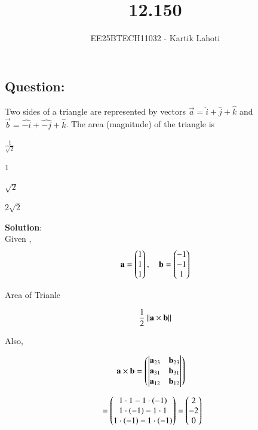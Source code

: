 \documentclass[journal]{IEEEtran}
\numberwithin{equation}{enumi}
\numberwithin{figure}{enumi}
\begin{document}

\vspace{3cm}

\title{12.150}
\author{EE25BTECH11032 - Kartik Lahoti}
\maketitle

\subsection*{Question: } 
Two sides of a triangle are represented by vectors $\vec{a} = \hat{i}+\hat{j}+\hat{k}$ and 
$\vec{b} = \hat{-i}+\hat{-j}+\hat{k}$. The area (magnitude) of the triangle is

\begin{enumerate}
    \begin{multicols}{4}
    \item $\frac{1}{\sqrt{2}}$
    \item $1$
    \item $\sqrt{2}$
    \item $2\sqrt{2}$
    \end{multicols}
\end{enumerate}

\textbf{Solution}:\\

Given , 
\begin{align}
    \mathbf{a} = \begin{pmatrix}1\\1\\1\end{pmatrix} , \quad \mathbf{b} = \begin{pmatrix}-1\\-1\\1\end{pmatrix}
\end{align}

Area of Trianle 

\begin{align}
    \frac{1}{2}\left\lVert\mathbf{a}\times\mathbf{b}\right\rVert
\end{align}

Also, 

\begin{align}
    \mathbf{a}\times\mathbf{b} &= \begin{pmatrix}\begin{vmatrix}\mathbf{a}_{23} \quad \mathbf{b}_{23}\end{vmatrix} \\ \begin{vmatrix}\mathbf{a}_{31} \quad \mathbf{b}_{31}\end{vmatrix} \\ \begin{vmatrix}\mathbf{a}_{12} \quad \mathbf{b}_{12}\end{vmatrix}\end{pmatrix}
\end{align}

\begin{align}
    &= \begin{pmatrix}1\cdot1 - 1\cdot\left(-1\right) \\ 1\cdot\left(-1\right) - 1\cdot1 \\ 1\cdot\left(-1\right) - 1\cdot\left(-1\right)\end{pmatrix} = \begin{pmatrix}2\\-2\\0\end{pmatrix}
\end{align}
\end{document}
